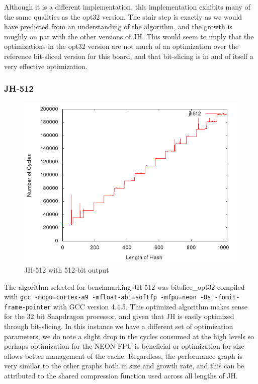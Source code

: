 Although it is a different implementation, this implementation exhibits many of
the same qualities as the opt32 version. The stair step is exactly as we would
have predicted from an understanding of the algorithm, and the growth is roughly
on par with the other versions of JH. This would seem to imply that the
optimizations in the opt32 version are not much of an optimization over the
reference bit-sliced version for this board, and that bit-slicing is in and of
itself a very effective optimization.

\subsubsection{JH-512}
\begin{figure}[H]
    \begin{center}
        \includegraphics[scale=0.5]{images/jh512.png} 
        \caption{JH-512 with 512-bit output}
    \end{center}
\end{figure}

The algorithm selected for benchmarking JH-512 was bitslice\_opt32 compiled with
\texttt{gcc -mcpu=cortex-a9 -mfloat-abi=softfp -mfpu=neon -Os -fomit- \\
frame-pointer} with GCC version 4.4.5. This optimized algorithm makes sense for
the 32 bit Snapdragon processor, and given that JH is easily optimized through
bit-slicing. In this instance we have a different set of optimization
parameters, we do note a slight drop in the cycles consumed at the high levels
so perhaps optimization for the NEON FPU is beneficial or optimization for size
allows better management of the cache. Regardless, the performance graph is very
similar to the other graphs both in size and growth rate, and this can be
attributed to the shared compression function used across all lengths of JH.
